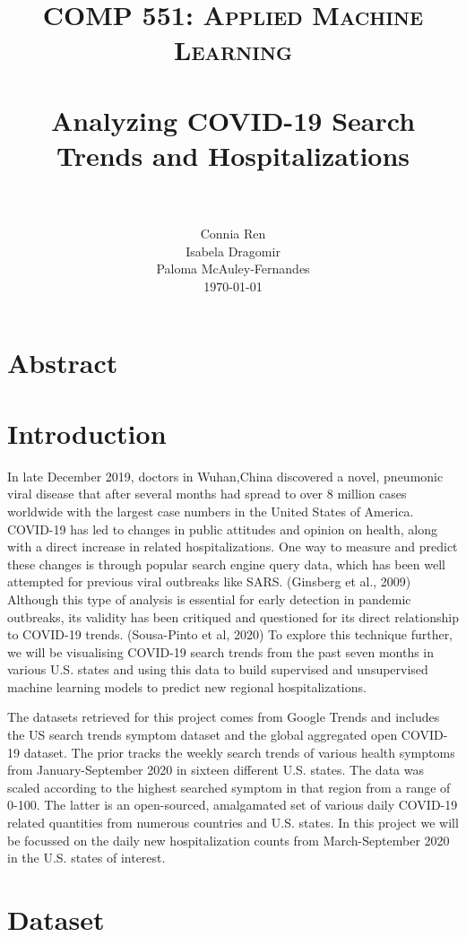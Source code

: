 \documentclass[paper=a4, fontsize=11pt]{scrartcl}
\title{
	\vspace{-1in} 	
	\usefont{OT1}{bch}{b}{n}
	\normalfont \normalsize \textsc{COMP 551: Applied Machine Learning} \\ [25pt]
	\horrule{0.5pt} \\[0.4cm]
	\huge Analyzing COVID-19 Search Trends and Hospitalizations \\
	\horrule{2pt} \\[0.5cm]
}
\author{
	\normalfont 								\normalsize
	Connia Ren\\[-3pt]		\normalsize
    Isabela Dragomir \\[-3pt]		\normalsize
    Paloma McAuley-Fernandes \\[-3pt]		\normalsize
	\today
}
\date{}
\numberwithin{equation}{section}		%
\numberwithin{figure}{section}			%
\numberwithin{table}{section}				%
\begin{document}
\maketitle
   
\section{Abstract}

\section{Introduction}

In late December 2019, doctors in Wuhan,China discovered a novel, pneumonic viral disease that after several months had spread to over 8 million cases worldwide with the largest case numbers in the United States of America. COVID-19 has led to changes in public attitudes and opinion on health, along with a direct increase in related hospitalizations. One way to measure and predict these changes is through popular search engine query data, which has been well attempted for previous viral outbreaks like SARS. (Ginsberg et al., 2009) Although this type of analysis is essential for early detection in pandemic outbreaks, its validity has been critiqued and questioned for its direct relationship to COVID-19 trends. (Sousa-Pinto et al, 2020) To explore this technique further, we will be visualising COVID-19 search trends from the past seven months in various U.S. states and using this data to build supervised and unsupervised machine learning models to predict new regional hospitalizations. 


The datasets retrieved for this project comes from Google Trends and includes the US search trends symptom dataset and the global aggregated open COVID-19 dataset. The prior tracks the weekly search trends of various health symptoms from January-September 2020 in sixteen different U.S. states. The data was scaled according to the highest searched symptom in that region from a range of 0-100. The latter is an open-sourced, amalgamated set of various daily COVID-19 related quantities from numerous countries and U.S. states. In this project we will be focussed on the daily new hospitalization counts from March-September 2020 in the U.S. states of interest. 

\section{Dataset}
\end{document}
